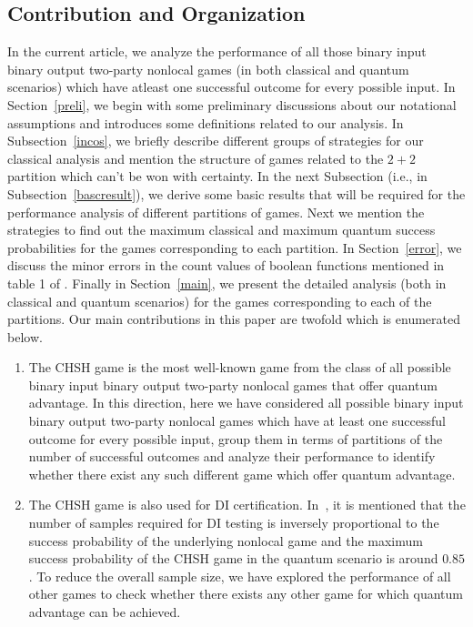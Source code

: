 \documentclass[]{svjour3}
\begin{document}
\subsection{Contribution and Organization}

In the current article, we analyze the performance of all those binary input binary output two-party nonlocal games (in both classical and quantum scenarios) which have atleast one successful outcome for every possible input. In Section~\ref{preli}, we begin with some preliminary discussions about our notational assumptions and introduces some definitions related to our analysis. In Subsection~\ref{incos}, we briefly describe different groups of strategies for our classical analysis and mention the structure of games related to the $2+2$ partition which can't be won with certainty. In the next Subsection (i.e., in Subsection~\ref{bascresult}), we derive some basic results that will be required for the performance analysis of different partitions of games. Next we mention the strategies to find out the maximum classical and maximum quantum success probabilities for the games corresponding to each partition. In Section~\ref{error}, we discuss the minor errors in the count values of boolean functions mentioned in table 1 of \cite{NGA19}. Finally in
Section~\ref{main}, we present the detailed analysis (both in classical and quantum scenarios) for the games corresponding to each of the partitions. Our main contributions in this paper are twofold which is enumerated below.

\begin{enumerate}
	
	\item The CHSH game is the most well-known game from the class of all possible binary input binary output two-party nonlocal games that offer quantum advantage. In this direction, here we have considered all possible binary input binary output two-party nonlocal games which have at least one successful outcome for every possible input, group them in terms of partitions of the number of successful outcomes and analyze their performance to identify whether there exist any such different game which offer quantum advantage.
	
	\item The CHSH game is also used for DI certification. In~\cite{JS18}, it is mentioned that the number of samples
	required for DI testing is inversely proportional to the success probability of the underlying nonlocal
	game and the maximum success probability of the CHSH game in the quantum scenario is around
	$0.85$. To reduce the overall sample size, we have
	explored the performance of all other games to check whether
	there exists any other game for which quantum advantage can
	be achieved.
	
\end{enumerate}
\end{document}
